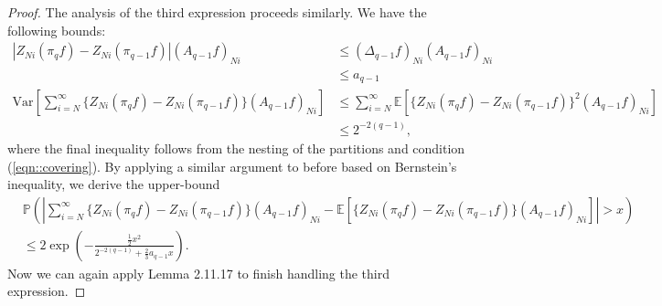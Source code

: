 \documentclass[11pt,a4paper]{article}
\newcommand{\E}{\mathbb{E}}
\renewcommand{\Pr}{\mathbb{P}}
\begin{document}
\begin{appendices}
\begin{proof}
    The analysis of the third expression proceeds similarly. We have the following bounds:
    \begin{align*}
        |Z_{Ni}(\pi_{q}f) - Z_{Ni}(\pi_{q-1}f)|(A_{q-1}f)_{Ni} &\leq (\Delta_{q-1}f)_{Ni}(A_{q-1}f)_{Ni} \\
        & \leq a_{q-1}\\
        \text{Var}\left[\sum_{i=N}^{\infty} \{Z_{Ni}(\pi_{q}f)-Z_{Ni}(\pi_{q-1}f)\}(A_{q-1}f)_{Ni}\right] & \leq \sum_{i=N}^{\infty}\E[\{Z_{Ni}(\pi_{q}f)-Z_{Ni}(\pi_{q-1}f)\}^{2}(A_{q-1}f)_{Ni}]\\
        &\leq 2^{-2(q-1)},
    \end{align*}
    where the final inequality follows from the nesting of the partitions and condition (\ref{eqn::covering}). By applying a similar argument to before based on Bernstein's inequality, we derive the upper-bound
    \begin{align*}
        &\Pr\left(\left|\sum_{i=N}^{\infty} \{Z_{Ni}(\pi_{q}f)-Z_{Ni}(\pi_{q-1}f)\}(A_{q-1}f)_{Ni} -\E[\{Z_{Ni}(\pi_{q}f)-Z_{Ni}(\pi_{q-1}f)\}(A_{q-1}f)_{Ni}]\right| > x\right) \\
        &\leq 2\exp\left(-\frac{\frac{1}{2}x^{2}}{2^{-2(q-1)}+\frac{2}{3}a_{q-1}x}\right).
    \end{align*}
    Now we can again apply Lemma 2.11.17 to finish handling the third expression.


\end{proof}
\end{appendices}
\end{document}
